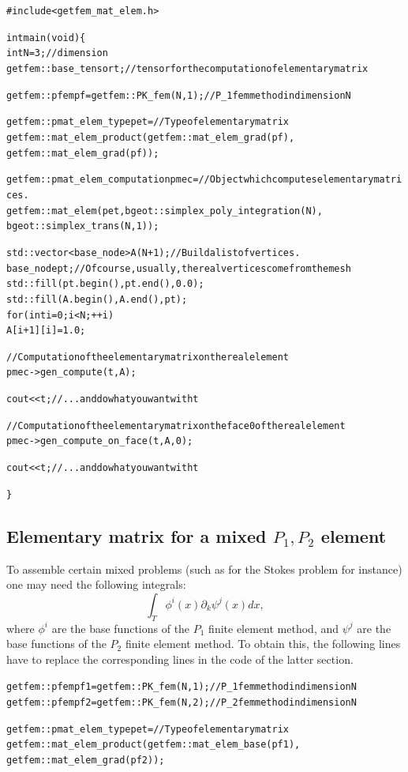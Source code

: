 \documentclass[11pt,a4paper]{article}
\begin{document}
\begin{alltt}
#include<getfem_mat_elem.h>

int main(void) \{
  int N = 3;                // dimension
  getfem::base_tensor t;    // tensor for the computation of elementary matrix

  getfem::pfem pf = getfem::PK_fem(N, 1); // P_1 fem method in dimension N

  getfem::pmat_elem_type pet = // Type of elementary matrix
     getfem::mat_elem_product(getfem::mat_elem_grad(pf),
                              getfem::mat_elem_grad(pf));

  getfem::pmat_elem_computation pmec = // Object which computes elementary matrices.
     getfem::mat_elem(pet, bgeot::simplex_poly_integration(N),
                           bgeot::simplex_trans(N, 1));

  std::vector<base_node> A(N+1);  // Build a list of vertices.
  base_node pt;  // Of course, usually, the real vertices come from the mesh
  std::fill(pt.begin(), pt.end(), 0.0);
  std::fill(A.begin(), A.end(), pt);
  for (int i = 0; i < N; ++i)
    A[i+1][i] = 1.0;

  // Computation of the elementary matrix on the real element
  pmec->gen_compute(t, A);

  cout << t; // ... and do what you want with t  

  // Computation of the elementary matrix on the face 0 of the real element
  pmec->gen_compute_on_face(t, A, 0); 

  cout << t; // ... and do what you want with t  

\}

\end{alltt}

\subsection{Elementary matrix for a mixed $P_1, P_2$ element}

To assemble certain mixed problems (such as for the Stokes problem for instance) one may need the following integrals:
$$ \int_T \phi^i(x) \partial_k \psi^j(x) dx, $$
where $\phi^i$ are the base functions of the $P_1$ finite element method, and $\psi^j$ are the base functions of the $P_2$ finite element method. To obtain this, the following lines have to replace the corresponding lines in the code of the latter section.

\begin{alltt}

  getfem::pfem pf1 = getfem::PK_fem(N, 1); // P_1 fem method in dimension N
  getfem::pfem pf2 = getfem::PK_fem(N, 2); // P_2 fem method in dimension N  

  getfem::pmat_elem_type pet = // Type of elementary matrix
     getfem::mat_elem_product(getfem::mat_elem_base(pf1),
                              getfem::mat_elem_grad(pf2));
                              
\end{alltt}
\end{document}
